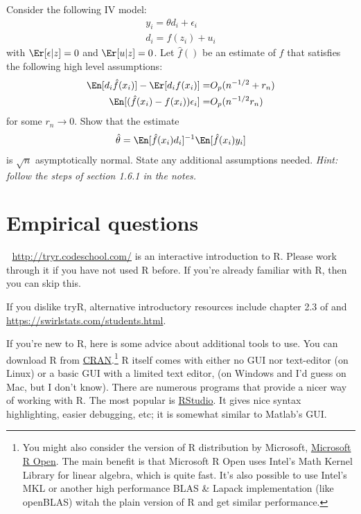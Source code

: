 \begin{problem}
  Consider the following IV model:
  \begin{align*}
    y_i = \theta d_i + \epsilon_i \\
    d_i = f(z_i) + u_i
  \end{align*}
  with $\Er[\epsilon|z] = 0$ and $\Er[u|z] = 0$. Let $\hat{f}()$ be an
  estimate of $f$ that satisfies the following high level assumptions:
  \begin{align}
    \En[d_i \hat{f}(x_i)] - \Er[d_i f(x_i)] = & O_p(n^{-1/2} +
                                                      r_n) \label{r1} \\
    \En[(\hat{f}(x_i) - f(x_i)) \epsilon_i] = & O_p(n^{-1/2} r_n) \label{r2}
  \end{align}
  for some $r_n \to 0$. Show that the estimate
  \begin{align*}
    \hat{\theta} = \En[\hat{f}(x_i) d_i]^{-1} \En[\hat{f}(x_i) y_i ]
  \end{align*}
  is $\sqrt{n}$ asymptotically normal. State any additional
  assumptions needed. {\slshape{Hint: follow the steps of section
      1.6.1 in the notes}.}
\end{problem}

\section{Empirical questions}

\begin{problem} $\;$
  \url{http://tryr.codeschool.com/} is an interactive introduction to
  R. Please work through it if you have not used R before. If you're
  already familiar with R, then you can skip this.

  If you dislike tryR, alternative introductory resources include
  chapter 2.3 of \cite{james2013} and \href{Swirl}
  {https://swirlstats.com/students.html}.   
\end{problem}

If you're new to R, here is some advice about additional tools to
use. You can download R from
\href{https://cran.r-project.org/}{CRAN}.\footnote{You might also consider the
version of R distribution by Microsoft,
\href{https://mran.microsoft.com/rro}{Microsoft R Open}. The main
benefit is that Microsoft R Open uses Intel's Math Kernel Library for
linear algebra, which is quite fast. It's also possible to use Intel's
MKL or another high performance BLAS \& Lapack implementation (like
openBLAS) witah the plain version of R and get similar
performance.}
R itself comes with either no GUI nor text-editor (on Linux) or a
basic GUI with a limited text editor, (on Windows and I'd guess on
Mac, but I don't know). There are numerous programs that provide a
nicer way of working with R. The most popular is
\href{https://www.rstudio.com/} {RStudio}. It gives nice syntax
highlighting, easier debugging, etc; it is somewhat similar to
Matlab's GUI.  

